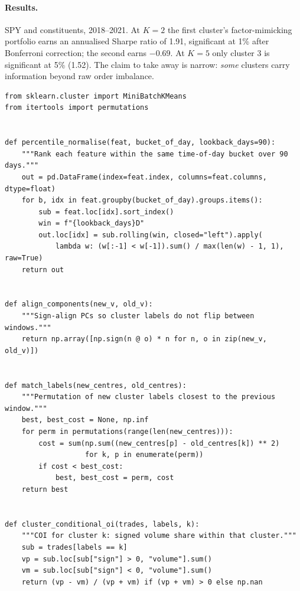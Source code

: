 \documentclass[11pt]{article}
\begin{document}
\paragraph{Results.} SPY and constituents, 2018--2021. At $K=2$ the first
cluster's factor-mimicking portfolio earns an annualised Sharpe ratio of
1.91, significant at 1\% after Bonferroni correction; the second earns $-0.69$.
At $K=5$ only cluster 3 is significant at 5\% (1.52). The claim to take away is
narrow: \emph{some} clusters carry information beyond raw order imbalance.

\begin{lstlisting}[caption={The Petit pipeline: percentile normalisation, PCA with sign
alignment, mini-batch k-means with label matching, cluster-conditional imbalance.}]
from sklearn.cluster import MiniBatchKMeans
from itertools import permutations


def percentile_normalise(feat, bucket_of_day, lookback_days=90):
    """Rank each feature within the same time-of-day bucket over 90 days."""
    out = pd.DataFrame(index=feat.index, columns=feat.columns, dtype=float)
    for b, idx in feat.groupby(bucket_of_day).groups.items():
        sub = feat.loc[idx].sort_index()
        win = f"{lookback_days}D"
        out.loc[idx] = sub.rolling(win, closed="left").apply(
            lambda w: (w[:-1] < w[-1]).sum() / max(len(w) - 1, 1), raw=True)
    return out


def align_components(new_v, old_v):
    """Sign-align PCs so cluster labels do not flip between windows."""
    return np.array([np.sign(n @ o) * n for n, o in zip(new_v, old_v)])


def match_labels(new_centres, old_centres):
    """Permutation of new cluster labels closest to the previous window."""
    best, best_cost = None, np.inf
    for perm in permutations(range(len(new_centres))):
        cost = sum(np.sum((new_centres[p] - old_centres[k]) ** 2)
                   for k, p in enumerate(perm))
        if cost < best_cost:
            best, best_cost = perm, cost
    return best


def cluster_conditional_oi(trades, labels, k):
    """COI for cluster k: signed volume share within that cluster."""
    sub = trades[labels == k]
    vp = sub.loc[sub["sign"] > 0, "volume"].sum()
    vm = sub.loc[sub["sign"] < 0, "volume"].sum()
    return (vp - vm) / (vp + vm) if (vp + vm) > 0 else np.nan
\end{lstlisting}

\end{document}
